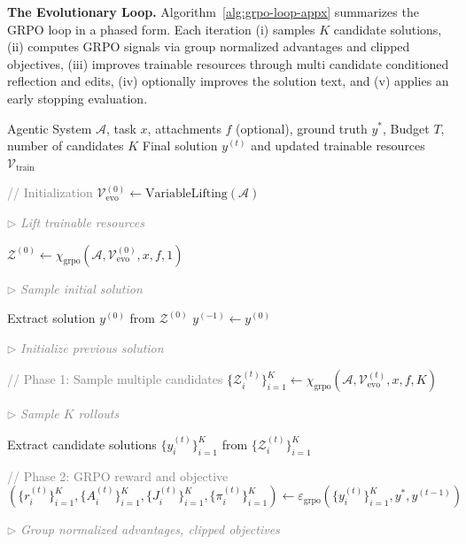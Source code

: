 \textbf{The Evolutionary Loop.}
Algorithm~\ref{alg:grpo-loop-appx} summarizes the GRPO loop in a phased form. Each iteration (i) samples $K$ candidate solutions, (ii) computes GRPO signals via group normalized advantages and clipped objectives, (iii) improves trainable resources through multi candidate conditioned reflection and edits, (iv) optionally improves the solution text, and (v) applies an early stopping evaluation.

\begin{algorithm}[t]
  \caption{GRPO Optimization Loop}
  \label{alg:grpo-loop-appx}
  \newcommand{\algcommentgrpo}[1]{\hfill\parbox[t]{0.48\linewidth}{\raggedleft\footnotesize\textcolor{gray}{$\rhd$ \textit{#1}}}}
  \begin{algorithmic}[1]
  \renewcommand{\algorithmicrequire}{\textbf{Input:}}
  \renewcommand{\algorithmicensure}{\textbf{Output:}}
  \REQUIRE Agentic System $\mathcal{A}$, task $x$, attachments $f$ (optional), ground truth $y^{*}$, Budget $T$, number of candidates $K$
  \ENSURE Final solution $y^{(t)}$ and updated trainable resources $\mathcal{V}_{\text{train}}$

  \STATE \textcolor{gray}{// Initialization}
  \STATE $\mathcal{V}_{\text{evo}}^{(0)} \leftarrow \text{VariableLifting}(\mathcal{A})$ \algcommentgrpo{Lift trainable resources}
  \STATE $\mathcal{Z}^{(0)} \leftarrow \chi_{\mathrm{grpo}}(\mathcal{A}, \mathcal{V}_{\text{evo}}^{(0)}, x, f, 1)$ \algcommentgrpo{Sample initial solution}
  \STATE Extract solution $y^{(0)}$ from $\mathcal{Z}^{(0)}$
  \STATE $y^{(-1)} \leftarrow y^{(0)}$ \algcommentgrpo{Initialize previous solution}
  
      \STATE \textcolor{gray}{// Phase 1: Sample multiple candidates}
      \STATE $\{\mathcal{Z}_i^{(t)}\}_{i=1}^K \leftarrow \chi_{\mathrm{grpo}}(\mathcal{A}, \mathcal{V}_{\text{evo}}^{(t)}, x, f, K)$ \algcommentgrpo{Sample $K$ rollouts}
      \STATE Extract candidate solutions $\{y_i^{(t)}\}_{i=1}^K$ from $\{\mathcal{Z}_i^{(t)}\}_{i=1}^K$
      
      \vspace{0.1em}
      \STATE \textcolor{gray}{// Phase 2: GRPO reward and objective}
      \STATE $(\{r_i^{(t)}\}_{i=1}^K, \{A_i^{(t)}\}_{i=1}^K, \{J_i^{(t)}\}_{i=1}^K, \{\pi_i^{(t)}\}_{i=1}^K) \leftarrow \varepsilon_{\mathrm{grpo}}(\{y_i^{(t)}\}_{i=1}^K, y^{*}, y^{(t-1)})$ \algcommentgrpo{Group normalized advantages, clipped objectives}


\end{algorithmic}
\end{algorithm}
